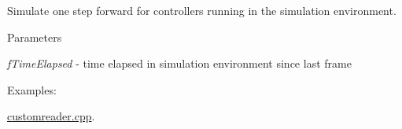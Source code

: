 Simulate one step forward for controllers running in the simulation environment. 


\begin{DoxyParams}{Parameters}
\item[{\em fTimeElapsed}]-\/ time elapsed in simulation environment since last frame \end{DoxyParams}
\begin{Desc}
\item[Examples: ]\par
\hyperlink{customreader_8cpp-example}{customreader.cpp}.\end{Desc}
